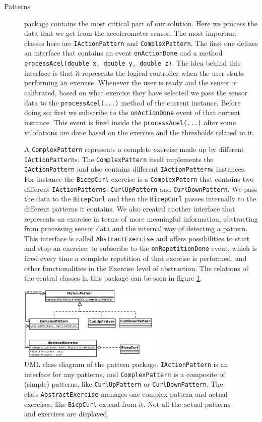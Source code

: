 \documentclass{tk3-team}
\begin{document}
\begin{description}
\item[Patterns] package contains the most critical part of our solution. Here we process the data that we get from the accelerometer sensor. The most important classes here are \texttt{IActionPattern} and \texttt{ComplexPattern}. The first one defines an interface that contains an event \texttt{onActionDone} and a method \texttt{processAcel(double x, double y, double z)}. The idea behind this interface is that it represents the logical controller when the user starts performing an exercise. Whenever the user is ready and the sensor is calibrated, based on what exercise they have selected we pass the sensor data to the \texttt{processAcel(...)} method of the current instance. Before doing so; first we subscribe to the \texttt{onActionDone} event of that current instance. This event is fired inside the \texttt{processAcel(...)} after some validations are done based on the exercise and the thresholds related to it.

A \texttt{ComplexPattern} represents a complete exercise made up by different \texttt{IActionPattern}s. The \texttt{ComplexPattern} itself implements the \texttt{IActionPattern} and also contains different \texttt{IActionPattern}s instances. For instance the \texttt{BicepCurl} exercise is a \texttt{ComplexPatern} that contains two different \texttt{IActionPatterns}: \texttt{CurlUpPattern} and \texttt{CurlDownPattern}. We pass the data to the \texttt{BicepCurl} and then the \texttt{BicepCurl} passes internally to the different patterns it contains. We also created another interface that represents an exercise in terms of more meaningful information, abstracting from processing sensor data and the internal way of detecting a pattern. This interface is called \texttt{AbstractExercise} and offers possibilities to start and stop an exercise; to subscribe to the \texttt{onRepetitionDone} event, which is fired every time a complete repetition of that exercise is performed, and other functionalities in the Exercise level of abstraction. The relations of the central classes in this package can be seen in figure \ref{fig_pattern_model}.
\end{description}

\begin{figure}[!t]
\centering
\includegraphics[width=0.6\textwidth]{img/Ilift_pattern_uml}
\caption{UML class diagram of the pattern package. \texttt{IActionPattern} is an interface for any patterns, and \texttt{ComplexPattern} is a composite of (simple) patterns, like \texttt{CurlUpPattern} or \texttt{CurlDownPattern}. The class \texttt{AbstractExercise} manages one complex pattern and actual exercises, like \texttt{BicpCurl} extend from it. Not all the actual patterns and exercises are displayed.}
\label{fig_pattern_model}
\end{figure}
\end{document}
